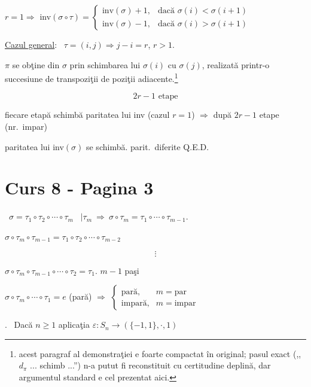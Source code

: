 \bigskip
\noindent $r=1 \Rightarrow$ inv$(\sigma\circ\tau) =
\begin{cases}
\text{inv}(\sigma)+1, & \text{dacă } \sigma(i)<\sigma(i+1)\\
\text{inv}(\sigma)-1, & \text{dacă } \sigma(i)>\sigma(i+1)
\end{cases}$

\bigskip
\noindent\underline{Cazul general}: \ $\tau=(i,j) \Rightarrow j-i=r$, $r>1$.

\noindent $\pi$ se obţine din $\sigma$ prin schimbarea lui $\sigma(i)$ cu $\sigma(j)$, realizată printr-o succesiune de transpoziţii de poziţii adiacente.\footnote{acest paragraf al demonstraţiei e foarte compactat în original; pasul exact (,,$d_\pi$ ... schimb ...'') n-a putut fi reconstituit cu certitudine deplină, dar argumentul standard e cel prezentat aici.}

\[
2r-1 \text{ etape}
\]

\noindent fiecare etapă schimbă paritatea lui inv (cazul $r=1$) $\Rightarrow$ după $2r-1$ etape (nr.\ impar)

\noindent paritatea lui inv$(\sigma)$ se schimbă. \hfill parit.\ diferite \quad Q.E.D.





\section*{Curs 8 - Pagina 3}

\noindent{} \ $\sigma=\tau_1\circ\tau_2\circ\cdots\circ\tau_m$ \ $\big|\tau_m \ \Rightarrow \ \sigma\circ\tau_m = \tau_1\circ\cdots\circ\tau_{m-1}.$

\bigskip
\noindent $\sigma\circ\tau_m\circ\tau_{m-1} = \tau_1\circ\tau_2\circ\cdots\circ\tau_{m-2}$

\[
\vdots
\]

\noindent $\sigma\circ\tau_m\circ\tau_{m-1}\circ\cdots\circ\tau_2 = \tau_1$. \quad $m-1$ paşi

\bigskip
\noindent $\sigma\circ\tau_m\circ\cdots\circ\tau_1 = e$ (pară) \quad $\Rightarrow$ \quad
$\begin{cases} \text{pară}, & m=\text{par}\\ \text{impară}, & m=\text{impar} \end{cases}$

\bigskip
\noindent{}. \ Dacă $n\geq 1$ aplicaţia $\varepsilon: S_n \to (\{-1,1\},\cdot,1)$

